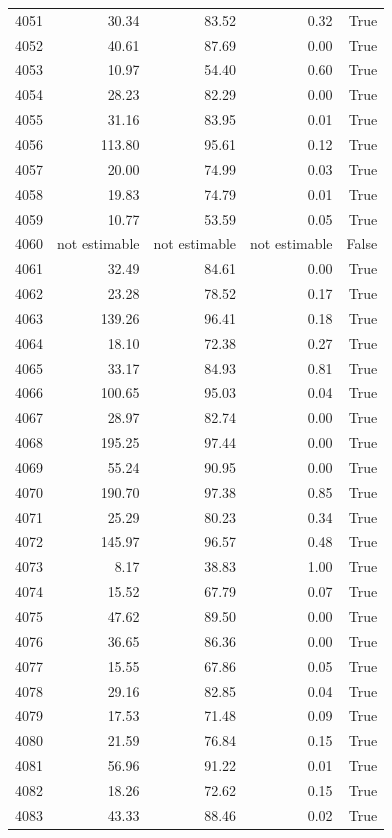 \begin{longtable}{rrrrr}
4051 & 30.34 & 83.52 & 0.32 & True \\
4052 & 40.61 & 87.69 & 0.00 & True \\
4053 & 10.97 & 54.40 & 0.60 & True \\
4054 & 28.23 & 82.29 & 0.00 & True \\
4055 & 31.16 & 83.95 & 0.01 & True \\
4056 & 113.80 & 95.61 & 0.12 & True \\
4057 & 20.00 & 74.99 & 0.03 & True \\
4058 & 19.83 & 74.79 & 0.01 & True \\
4059 & 10.77 & 53.59 & 0.05 & True \\
4060 & not estimable & not estimable & not estimable & False \\
4061 & 32.49 & 84.61 & 0.00 & True \\
4062 & 23.28 & 78.52 & 0.17 & True \\
4063 & 139.26 & 96.41 & 0.18 & True \\
4064 & 18.10 & 72.38 & 0.27 & True \\
4065 & 33.17 & 84.93 & 0.81 & True \\
4066 & 100.65 & 95.03 & 0.04 & True \\
4067 & 28.97 & 82.74 & 0.00 & True \\
4068 & 195.25 & 97.44 & 0.00 & True \\
4069 & 55.24 & 90.95 & 0.00 & True \\
4070 & 190.70 & 97.38 & 0.85 & True \\
4071 & 25.29 & 80.23 & 0.34 & True \\
4072 & 145.97 & 96.57 & 0.48 & True \\
4073 & 8.17 & 38.83 & 1.00 & True \\
4074 & 15.52 & 67.79 & 0.07 & True \\
4075 & 47.62 & 89.50 & 0.00 & True \\
4076 & 36.65 & 86.36 & 0.00 & True \\
4077 & 15.55 & 67.86 & 0.05 & True \\
4078 & 29.16 & 82.85 & 0.04 & True \\
4079 & 17.53 & 71.48 & 0.09 & True \\
4080 & 21.59 & 76.84 & 0.15 & True \\
4081 & 56.96 & 91.22 & 0.01 & True \\
4082 & 18.26 & 72.62 & 0.15 & True \\
4083 & 43.33 & 88.46 & 0.02 & True \\

\end{longtable}
